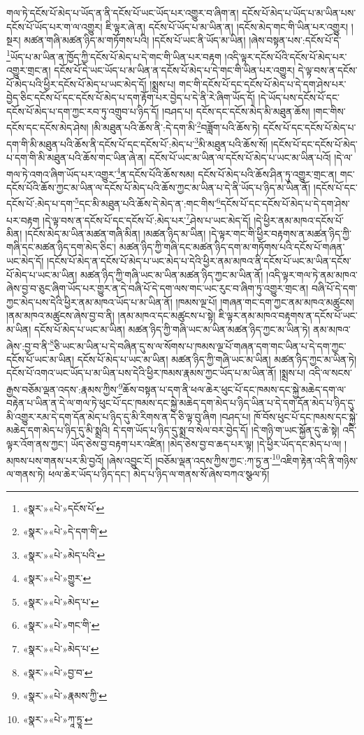 གལ་ཏེ་དངོས་པོ་མེད་པ་ཡོད་ན་ནི་དངོས་པོ་ཡང་ཡོད་པར་འགྱུར་བ་ཞིག་ན། དངོས་པོ་མེད་པ་ཡོད་པ་མ་ཡིན་པས་དངོས་པོ་ཡོད་པར་ག་ལ་འགྱུར། ཇི་ལྟར་ཞེ་ན། དངོས་པོ་ཡོད་པ་མ་ཡིན་ན། །དངོས་མེད་གང་གི་ཡིན་པར་འགྱུར། །སྔར། མཚན་གཞི་མཚན་ཉིད་མ་གཏོགས་པའི། །དངོས་པོ་ཡང་ནི་ཡོད་མ་ཡིན། །ཞེས་བསྟན་པས་:དངོས་པོ་དེ་\footnote{«སྣར་»«པེ་»དངོས་པོ་}ཡོད་པ་མ་ཡིན་ན་ཁྱོད་ཀྱི་དངོས་པོ་མེད་པ་དེ་གང་གི་ཡིན་པར་བརྟག །འདི་ལྟར་དངོས་པོའི་དངོས་པོ་མེད་པར་འགྱུར་གྲང་ན། དངོས་པོ་དེ་ཡང་ཡོད་པ་མ་ཡིན་ན་དངོས་པོ་མེད་པ་དེ་གང་གི་ཡིན་པར་འགྱུར། དེ་ལྟ་བས་ན་དངོས་པོ་མེད་པའི་ཕྱིར་དངོས་པོ་མེད་པ་ཡང་མེད་དོ། །སྨྲས་པ། གང་གི་དངོས་པོ་དང་དངོས་པོ་མེད་པ་དེ་དག་ཤེས་པར་བྱེད་ཅིང་དངོས་པོ་དང་དངོས་པོ་མེད་པ་དག་རྟོག་པར་བྱེད་པ་དེ་ནི་རེ་ཞིག་ཡོད་དོ། །དེ་ཡོད་པས་དངོས་པོ་དང་དངོས་པོ་མེད་པ་དག་ཀྱང་རབ་ཏུ་འགྲུབ་པ་ཉིད་དོ། །བཤད་པ། དངོས་དང་དངོས་མེད་མི་མཐུན་ཆོས། །གང་གིས་དངོས་དང་དངོས་མེད་ཤེས། །མི་མཐུན་པའི་ཆོས་ནི་:དེ་དག་མི་\footnote{«སྣར་»«པེ་»དེ་དག་གི་}བཟློག་པའི་ཆོས་ཏེ། དངོས་པོ་དང་དངོས་པོ་མེད་པ་དག་གི་མི་མཐུན་པའི་ཆོས་ནི་དངོས་པོ་དང་དངོས་པོ་:མེད་པ་\footnote{«སྣར་»«པེ་»མེད་པའི་}མི་མཐུན་པའི་ཆོས་སོ། །དངོས་པོ་དང་དངོས་པོ་མེད་པ་དག་གི་མི་མཐུན་པའི་ཆོས་གང་ཡིན་ཞེ་ན། དངོས་པོ་ཡང་མ་ཡིན་ལ་དངོས་པོ་མེད་པ་ཡང་མ་ཡིན་པའོ། །དེ་ལ་གལ་ཏེ་འགའ་ཞིག་ཡོད་པར་འགྱུར་\footnote{«སྣར་»«པེ་»གྱུར་}ན་དངོས་པོའི་ཆོས་སམ། དངོས་པོ་མེད་པའི་ཆོས་ཤིན་ཏུ་འགྱུར་གྲང་ན། གང་དངོས་པོའི་ཆོས་ཀྱང་མ་ཡིན་ལ་དངོས་པོ་མེད་པའི་ཆོས་ཀྱང་མ་ཡིན་པ་དེ་ནི་ཡོད་པ་ཉིད་མ་ཡིན་ནོ། །དངོས་པོ་དང་དངོས་པོ་:མེད་པ་དག་\footnote{«སྣར་»«པེ་»མེད་པ་}དང་མི་མཐུན་པའི་ཆོས་དེ་མེད་ན་:གང་གིས་\footnote{«སྣར་»«པེ་»གང་གི་}དངོས་པོ་དང་དངོས་པོ་མེད་པ་དེ་དག་ཤེས་པར་བརྟག །དེ་ལྟ་བས་ན་དངོས་པོ་དང་དངོས་པོ་:མེད་པར་\footnote{«སྣར་»«པེ་»མེད་པ་}ཤེས་པ་ཡང་མེད་དོ། །དེ་ཕྱིར་ནམ་མཁའ་དངོས་པོ་མིན། །དངོས་མེད་མ་ཡིན་མཚན་གཞི་མིན། །མཚན་ཉིད་མ་ཡིན། །དེ་ལྟར་གང་གི་ཕྱིར་བརྟགས་ན་མཚན་ཉིད་ཀྱི་གཞི་དང་མཚན་ཉིད་དག་མེད་ཅིང་། མཚན་ཉིད་ཀྱི་གཞི་དང་མཚན་ཉིད་དག་མ་གཏོགས་པའི་དངོས་པོ་གཞན་ཡང་མེད་དོ། །དངོས་པོ་མེད་ན་དངོས་པོ་མེད་པ་ཡང་མེད་པ་དེའི་ཕྱིར་ནམ་མཁའ་ནི་དངོས་པོ་ཡང་མ་ཡིན་དངོས་པོ་མེད་པ་ཡང་མ་ཡིན། མཚན་ཉིད་ཀྱི་གཞི་ཡང་མ་ཡིན་མཚན་ཉིད་ཀྱང་མ་ཡིན་ནོ། །འདི་ལྟར་གལ་ཏེ་ནམ་མཁའ་ཞེས་བྱ་བ་ཅུང་ཞིག་ཡོད་པར་གྱུར་ན་དེ་བཞི་པོ་དེ་དག་ལས་གང་ཡང་རུང་བ་ཞིག་ཏུ་འགྱུར་གྲང་ན། བཞི་པོ་དེ་དག་ཀྱང་མེད་པས་དེའི་ཕྱིར་ནམ་མཁའ་ཡོད་པ་མ་ཡིན་ནོ། །ཁམས་ལྔ་པོ། །གཞན་གང་དག་ཀྱང་ནམ་མཁའ་མཚུངས། །ནམ་མཁའ་མཚུངས་ཞེས་བྱ་བ་ནི། །ནམ་མཁའ་དང་མཚུངས་པ་སྟེ། ཇི་ལྟར་ནམ་མཁའ་བརྟགས་ན་དངོས་པོ་ཡང་མ་ཡིན། དངོས་པོ་མེད་པ་ཡང་མ་ཡིན། མཚན་ཉིད་ཀྱི་གཞི་ཡང་མ་ཡིན་མཚན་ཉིད་ཀྱང་མ་ཡིན་ཏེ། ནམ་མཁའ་ཞེས་:བྱ་བ་ནི་\footnote{«སྣར་»«པེ་»བྱ་བ་}ཅི་ཡང་མ་ཡིན་པ་དེ་བཞིན་དུ་ས་ལ་སོགས་པ་ཁམས་ལྔ་པོ་གཞན་དག་གང་ཡིན་པ་དེ་དག་ཀྱང་དངོས་པོ་ཡང་མ་ཡིན། དངོས་པོ་མེད་པ་ཡང་མ་ཡིན། མཚན་ཉིད་ཀྱི་གཞི་ཡང་མ་ཡིན། མཚན་ཉིད་ཀྱང་མ་ཡིན་ཏེ། དངོས་པོ་འགའ་ཡང་ཡོད་པ་མ་ཡིན་པས་དེའི་ཕྱིར་ཁམས་རྣམས་ཀྱང་ཡོད་པ་མ་ཡིན་ནོ། །སྨྲས་པ། འདི་ལ་སངས་རྒྱས་བཅོམ་ལྡན་འདས་:རྣམས་ཀྱིས་\footnote{«སྣར་»«པེ་»རྣམས་ཀྱི་}ཆོས་བསྟན་པ་དག་ནི་ཕལ་ཆེར་ཕུང་པོ་དང་ཁམས་དང་སྐྱེ་མཆེད་དག་ལ་བརྟེན་པ་ཡིན་ན་དེ་ལ་གལ་ཏེ་ཕུང་པོ་དང་ཁམས་དང་སྐྱེ་མཆེད་དག་མེད་པ་ཉིད་ཡིན་པ་དེ་དག་དོན་མེད་པ་ཉིད་དུ་མི་འགྱུར་རམ་དེ་དག་དོན་མེད་པ་ཉིད་དུ་མི་རིགས་ན་དེ་ཅི་ལྟ་བུ་ཞིག །བཤད་པ། ཁོ་བོས་ཕུང་པོ་དང་ཁམས་དང་སྐྱེ་མཆེད་དག་མེད་པ་ཉིད་དུ་མི་སྨྲའི། དེ་དག་ཡོད་པ་ཉིད་དུ་སྨྲ་བ་སེལ་བར་བྱེད་དོ། །དེ་གཉི་ག་ཡང་སྐྱོན་དུ་ཆེ་སྟེ། འདི་ལྟར་འོག་ནས་ཀྱང་། ཡོད་ཅེས་བྱ་བརྟག་པར་འཛིན། །མེད་ཅེས་བྱ་བ་ཆད་པར་ལྟ། །དེ་ཕྱིར་ཡོད་དང་མེད་པ་ལ། །མཁས་པས་གནས་པར་མི་བྱའོ། །ཞེས་འབྱུང་ངོ། །བཅོམ་ལྡན་འདས་ཀྱིས་ཀྱང་:ཀ་ཏྱ་ན་\footnote{«སྣར་»«པེ་»ཀཱ་ཏྱཱ་}འཇིག་རྟེན་འདི་ནི་གཉིས་ལ་གནས་ཏེ། ཕལ་ཆེར་ཡོད་པ་ཉིད་དང་། མེད་པ་ཉིད་ལ་གནས་སོ་ཞེས་བཀའ་སྩལ་ཏོ། 